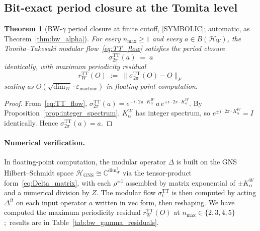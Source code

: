 \documentclass[11pt,a4paper]{article}
\theoremstyle{plain}
\newtheorem{theorem}{Theorem}[section]
\theoremstyle{definition}
\newcommand{\nmax}{n_{\max}}
\newcommand{\Hilb}{\mathcal{H}}
\newcommand{\Frob}[1]{\lVert #1 \rVert_{F}}
\newcommand{\C}{\mathbb{C}}
\newcommand{\TT}{\mathrm{TT}}
\newcommand{\GNS}{\mathrm{GNS}}
\begin{document}
\subsection{Bit-exact period closure at the Tomita level}
\label{sec:tt_period}

\begin{theorem}[BW-$\gamma$ period closure at finite cutoff, {[SYMBOLIC]};
automatic, as Theorem~\ref{thm:bw_alpha}]
\label{thm:bw_gamma}
For every $\nmax \ge 1$ and every $a \in B(\Hilb_W)$, the
Tomita--Takesaki modular flow~\eqref{eq:TT_flow} satisfies the
period closure
\begin{equation}\label{eq:bw_gamma_closure}
   \sigma_{2\pi}^{\TT}(a) \;=\; a
\end{equation}
identically, with maximum periodicity residual
\begin{equation*}
   r_W^{\TT}(O)
   \;:=\; \Frob{\sigma_{2\pi}^{\TT}(O) - O}
\end{equation*}
scaling as $O(\sqrt{\dim_W} \cdot \varepsilon_{\mathrm{machine}})$ in
floating-point computation.
\end{theorem}

\begin{proof}
From~\eqref{eq:TT_flow}, $\sigma_{2\pi}^{\TT}(a) = e^{-i \cdot 2\pi
\cdot K_\alpha^W}\, a\, e^{+i \cdot 2\pi \cdot K_\alpha^W}$. By
Proposition~\ref{prop:integer_spectrum}, $K_\alpha^W$ has integer
spectrum, so $e^{\pm i \cdot 2\pi \cdot K_\alpha^W} = I$ identically.
Hence $\sigma_{2\pi}^{\TT}(a) = a$.
\end{proof}

\paragraph{Numerical verification.}
In floating-point computation, the modular operator $\Delta$ is built
on the GNS Hilbert--Schmidt space $\Hilb_{\GNS} \cong \C^{\dim_W^2}$
via the tensor-product form~\eqref{eq:Delta_matrix}, with each
$\rho^{\pm 1}$ assembled by matrix exponential of $\pm K_\alpha^W$ and
a numerical division by $Z$. The modular flow $\sigma_t^{\TT}$ is then
computed by acting $\Delta^{it}$ on each input operator $a$ written in
$\mathrm{vec}$ form, then reshaping. We have computed the maximum
periodicity residual $r_W^{\TT}(O)$ at $\nmax \in \{2, 3, 4, 5\}$;\
results are in Table~\ref{tab:bw_gamma_residuals}.
\end{document}
